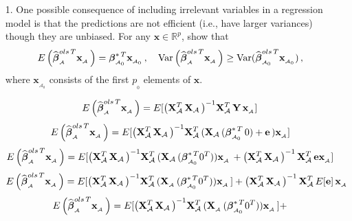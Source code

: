 \documentclass[11pt]{report}
\newcommand{\bfmath}[1]{\mbox{\boldmath$#1$\unboldmath}}
\begin{document}
\begin{enumerate}
\item[1. ] One possible consequence of including irrelevant variables in a regression model is that the predictions are not efficient (i.e., have larger variances) though they are unbiased. For any $\mathbf{x}\in\mathbb{R}^p$, show that
$$E\left( \widehat{\bfmath{\beta}}^{ols\,T}_{_\mathcal{A}}\mathbf{x}_{_\mathcal{A}}\,\right)=\bfmath{\beta}^{\ast\,T}_{_{\mathcal{A}_0}}\mathbf{x}_{_{\mathcal{A}_0}}\,,\quad \text{Var}\left( \widehat{\bfmath{\beta}}^{ols\,T}_{_\mathcal{A}}\mathbf{x}_{_\mathcal{A}}\,\right)\geq \text{Var}(\widehat{\bfmath{\beta}}^{ols\,T}_{_{\mathcal{A}_0}}\mathbf{x}_{_{\mathcal{A}_0}})\,,$$
where $\mathbf{x}_{_{\mathcal{A}_0}}$ consists of the first $p_{_0}$
elements of $\mathbf{x}$.   

$$E\left( \widehat{\bfmath{\beta}}^{ols\,T}_{_\mathcal{A}}\mathbf{x}_{_\mathcal{A}}\,\right)= E[{\left( \mathbf{X}_{\mathcal{A}}^{T}\,\mathbf{X}_{\mathcal{A}}\,\right)}^{-1}\mathbf{X}_{\mathcal{A}}^{T}\,\mathbf{Y}\,\mathbf{x}_{_\mathcal{A}}]$$
$$E\left( \widehat{\bfmath{\beta}}^{ols\,T}_{_\mathcal{A}}\mathbf{x}_{_\mathcal{A}}\,\right)= E\lbrack{\left( \mathbf{X}_{\mathcal{A}}^{T}\,\mathbf{X}_{\mathcal{A}}\,\right)}^{-1}\mathbf{X}_{\mathcal{A}}^{T}\,(\mathbf{X}_{\mathcal{A}}\,(\bfmath{\beta}^{\ast\,T}_{_{\mathcal{A}_0}}\, 0) + \mathbf{e}\,)\mathbf{x}_{_\mathcal{A}}\rbrack$$
$$E\left( \widehat{\bfmath{\beta}}^{ols\,T}_{_\mathcal{A}}\mathbf{x}_{_\mathcal{A}}\,\right)= E\lbrack{\left( \mathbf{X}_{\mathcal{A}}^{T}\,\mathbf{X}_{\mathcal{A}}\,\right)}^{-1}\mathbf{X}_{\mathcal{A}}^{T}\,(\mathbf{X}_{\mathcal{A}}\,(\bfmath{\beta}^{\ast\,T}_{_{\mathcal{A}_0}} 0^{T}))\mathbf{x}_{_\mathcal{A}}\,+
 \left(\mathbf{X}_{\mathcal{A}}^{T}\,\mathbf{X}_{\mathcal{A}}\,\right)^{-1}\mathbf{X}_{\mathcal{A}}^{T}\,\mathbf{e}\mathbf{x}_{_\mathcal{A}}\rbrack$$
$$E\left( \widehat{\bfmath{\beta}}^{ols\,T}_{_\mathcal{A}}\mathbf{x}_{_\mathcal{A}}\,\right)= E\lbrack{\left( \mathbf{X}_{\mathcal{A}}^{T}\,\mathbf{X}_{\mathcal{A}}\,\right)}^{-1}\mathbf{X}_{\mathcal{A}}^{T}\,(\mathbf{X}_{_{\mathcal{A}}}\,(\bfmath{\beta}^{\ast\,T}_{_{\mathcal{A}_0}} 0^{T}))\mathbf{x}_{_\mathcal{A}}\,\rbrack + 
 \left(\mathbf{X}_{\mathcal{A}}^{T}\,\mathbf{X}_{\mathcal{A}}\,\right)^{-1}\mathbf{X}_{\mathcal{A}}^{T}\,E\lbrack\mathbf{e}\rbrack\,\mathbf{x}_{_\mathcal{A}}$$
$$E\left( \widehat{\bfmath{\beta}}^{ols\,T}_{_\mathcal{A}}\mathbf{x}_{_\mathcal{A}}\,\right)= E\lbrack{\left( \mathbf{X}_{\mathcal{A}}^{T}\,\mathbf{X}_{\mathcal{A}}\,\right)}^{-1}\mathbf{X}_{\mathcal{A}}^{T}\,(\mathbf{X}_{_{\mathcal{A}}}\,(\bfmath{\beta}^{\ast\,T}_{_{\mathcal{A}_0}}  0^{T}))\mathbf{x}_{_\mathcal{A}}\,\rbrack + 
$$
\end{enumerate}
\end{document}
